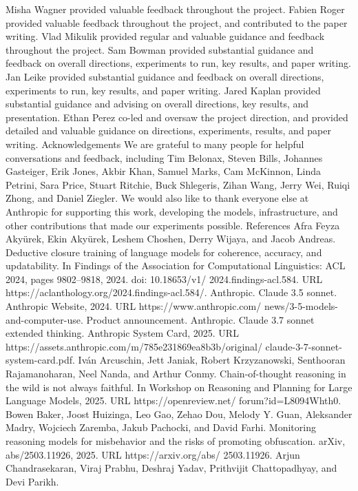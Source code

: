 Misha Wagner provided valuable feedback throughout the project. Fabien Roger provided valuable
feedback throughout the project, and contributed to the paper writing. Vlad Mikulik provided regular
and valuable guidance and feedback throughout the project. Sam Bowman provided substantial
guidance and feedback on overall directions, experiments to run, key results, and paper writing. Jan
Leike provided substantial guidance and feedback on overall directions, experiments to run, key
results, and paper writing. Jared Kaplan provided substantial guidance and advising on overall
directions, key results, and presentation. Ethan Perez co-led and oversaw the project direction, and
provided detailed and valuable guidance on directions, experiments, results, and paper writing.
Acknowledgements
We are grateful to many people for helpful conversations and feedback, including Tim Belonax,
Steven Bills, Johannes Gasteiger, Erik Jones, Akbir Khan, Samuel Marks, Cam McKinnon, Linda
Petrini, Sara Price, Stuart Ritchie, Buck Shlegeris, Zihan Wang, Jerry Wei, Ruiqi Zhong, and Daniel
Ziegler. We would also like to thank everyone else at Anthropic for supporting this work, developing
the models, infrastructure, and other contributions that made our experiments possible.
References
Afra Feyza Akyürek, Ekin Akyürek, Leshem Choshen, Derry Wijaya, and Jacob Andreas. Deductive
closure training of language models for coherence, accuracy, and updatability. In Findings of the
Association for Computational Linguistics: ACL 2024, pages 9802–9818, 2024. doi: 10.18653/v1/
2024.findings-acl.584. URL https://aclanthology.org/2024.findings-acl.584/.
Anthropic. Claude 3.5 sonnet. Anthropic Website, 2024. URL https://www.anthropic.com/
news/3-5-models-and-computer-use. Product announcement.
Anthropic.
Claude
3.7
sonnet
extended
thinking.
Anthropic
System
Card,
2025.
URL
https://assets.anthropic.com/m/785e231869ea8b3b/original/
claude-3-7-sonnet-system-card.pdf.
Iván Arcuschin, Jett Janiak, Robert Krzyzanowski, Senthooran Rajamanoharan, Neel Nanda, and
Arthur Conmy. Chain-of-thought reasoning in the wild is not always faithful. In Workshop on
Reasoning and Planning for Large Language Models, 2025. URL https://openreview.net/
forum?id=L8094Whth0.
Bowen Baker, Joost Huizinga, Leo Gao, Zehao Dou, Melody Y. Guan, Aleksander Madry, Wojciech
Zaremba, Jakub Pachocki, and David Farhi. Monitoring reasoning models for misbehavior and the
risks of promoting obfuscation. arXiv, abs/2503.11926, 2025. URL https://arxiv.org/abs/
2503.11926.
Arjun Chandrasekaran, Viraj Prabhu, Deshraj Yadav, Prithvijit Chattopadhyay, and Devi Parikh.
